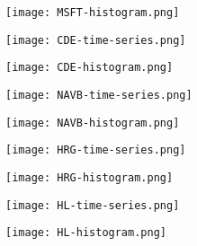 \begin{center}
    \texttt{[image: MSFT-histogram.png]}
    \label{fig:nonfloat}
\end{center}

\begin{center}  
    \texttt{[image: CDE-time-series.png]}
    \label{fig:nonfloat}
\end{center}

\begin{center}  
    \texttt{[image: CDE-histogram.png]}
    \label{fig:nonfloat}
\end{center}

\begin{center}
  
    \texttt{[image: NAVB-time-series.png]}
    \label{fig:nonfloat}
\end{center}

\begin{center}
  
    \texttt{[image: NAVB-histogram.png]}
    \label{fig:nonfloat}
\end{center}

\begin{center}
    \texttt{[image: HRG-time-series.png]}
    \label{fig:nonfloat}
\end{center}

\begin{center}  
    \texttt{[image: HRG-histogram.png]}
    \label{fig:nonfloat}
\end{center}

\begin{center}
    \texttt{[image: HL-time-series.png]}
    \label{fig:nonfloat}
\end{center}

\begin{center}  
    \texttt{[image: HL-histogram.png]}
    \label{fig:nonfloat}
\end{center}

